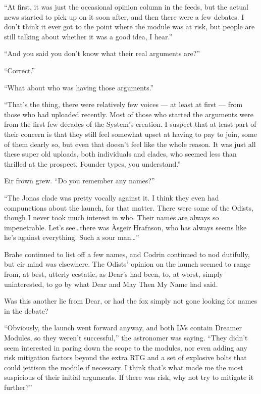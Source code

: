 ``At first, it was just the occasional opinion column in the feeds, but the actual news started to pick up on it soon after, and then there were a few debates. I don't think it ever got to the point where the module was at risk, but people are still talking about whether it was a good idea, I hear.''

``And you said you don't know what their real arguments are?''

``Correct.''

``What about who was having those arguments.''

``That's the thing, there were relatively few voices — at least at first — from those who had uploaded recently. Most of those who started the arguments were from the first few decades of the System's creation. I suspect that at least part of their concern is that they still feel somewhat upset at having to pay to join, some of them dearly so, but even that doesn't feel like the whole reason. It was just all these super old uploads, both individuals and clades, who seemed less than thrilled at the prospect. Founder types, you understand.''

Eir frown grew. ``Do you remember any names?''

``The Jonas clade was pretty vocally against it. I think they even had compunctions about the launch, for that matter. There were some of the Odists, though I never took much interest in who. Their names are always so impenetrable. Let's see\ldots there was Àsgeir Hrafnson, who has always seems like he's against everything. Such a sour man\ldots{}''

Brahe continued to list off a few names, and Codrin continued to nod dutifully, but eir mind was elsewhere. The Odists' opinion on the launch seemed to range from, at best, utterly ecstatic, as Dear's had been, to, at worst, simply uninterested, to go by what Dear and May Then My Name had said.

Was this another lie from Dear, or had the fox simply not gone looking for names in the debate?

``Obviously, the launch went forward anyway, and both LVs contain Dreamer Modules, so they weren't successful,'' the astronomer was saying. ``They didn't seem interested in paring down the scope to the modules, nor even adding any risk mitigation factors beyond the extra RTG and a set of explosive bolts that could jettison the module if necessary. I think that's what made me the most suspicious of their initial arguments. If there was risk, why not try to mitigate it further?''

